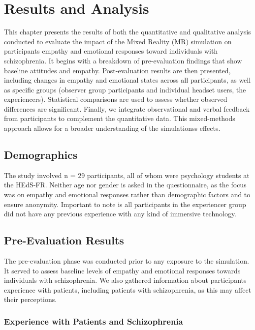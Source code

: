 \chapter{Results and Analysis}
\label{ch:resultsandanalysis}

This chapter presents the results of both the quantitative and qualitative analysis conducted to evaluate the impact of the Mixed Reality (MR) simulation on participants empathy and emotional responses toward individuals with schizophrenia. It begins with a breakdown of pre-evaluation findings that show baseline attitudes and empathy. Post-evaluation results are then presented, including changes in empathy and emotional states across all participants, as well as specific groups (observer group participants and individual headset users, the experiencers). Statistical comparisons are used to assess whether observed differences are significant. Finally, we integrate observational and verbal feedback from participants to complement the quantitative data. This mixed-methods approach allows for a broader understanding of the simulationss effects.

\section{Demographics}
The study involved n = 29 participants, all of whom were psychology students at the HEdS-FR. Neither age nor gender is asked in the questionnaire, as the focus was on empathy and emotional responses rather than demographic factors and to ensure anonymity. Important to note is all participants in the experiencer group did not have any previous experience with any kind of immersive technology.

\section{Pre-Evaluation Results}
The pre-evaluation phase was conducted prior to any exposure to the simulation. It served to assess baseline levels of empathy and emotional responses towards individuals with schizophrenia. We also gathered information about participants experience with patients, including patients with schizophrenia, as this may affect their perceptions.

\subsection{Experience with Patients and Schizophrenia}

